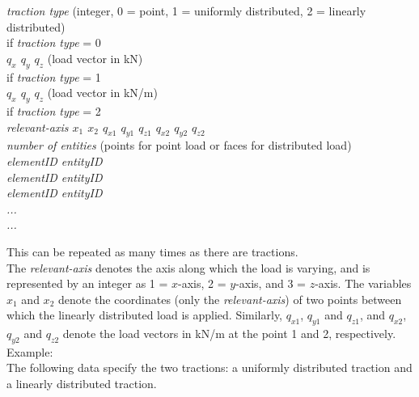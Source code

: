 \emph{traction type} (integer, 0 = point, 1 = uniformly distributed, 2 = linearly distributed)\\
if \emph{traction type} = 0\\
  \emph{$q_x$ $q_y$ $q_z$} (load vector in kN)\\
if \emph{traction type} = 1\\
  \emph{$q_x$ $q_y$ $q_z$} (load vector in kN/m)\\
if \emph{traction type} = 2\\
  \emph{relevant-axis $x_1$ $x_2$ $q_{x1}$ $q_{y1}$ $q_{z1}$ $q_{x2}$ $q_{y2}$ $q_{z2}$}\\
\emph{number of entities} (points for point load or faces for distributed load)\\
\emph{elementID entityID \\
elementID entityID \\
elementID entityID \\
...\\
...\\}

This can be repeated as many times as there are tractions.\\

The \emph{relevant-axis} denotes the axis along which the load is varying, and is represented by an integer as 1 = $x$-axis, 2 = $y$-axis, and 3 = $z$-axis. The variables $x_1$ and $x_2$ denote the coordinates (only the \emph{relevant-axis}) of two points between which the linearly distributed load is applied. Similarly, $q_{x1}$, $q_{y1}$ and $q_{z1}$, and $q_{x2}$, $q_{y2}$ and $q_{z2}$ denote the load vectors in kN/m at the point 1 and 2, respectively.\\

Example:\\
The following data specify the two tractions: a uniformly distributed traction and a linearly distributed traction.\\\\

